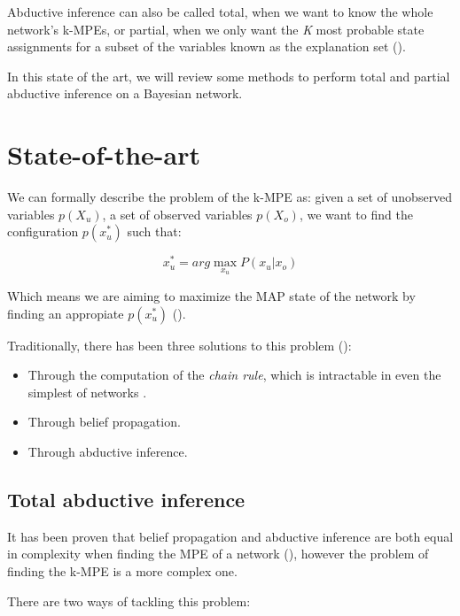 \documentclass[a4paper,11pt]{article}
\begin{document}
Abductive inference can also be called total, when we want to know the whole network's k-MPEs, or partial, when we only want the \textit{K} most probable state assignments for a subset of the variables known as the explanation set 
(\cite{fortier2013}).

In this state of the art, we will review some methods to perform total and partial abductive inference on a Bayesian network.

\section{State-of-the-art}

We can formally describe the problem of the k-MPE as: given a set of unobserved variables $p(X_u)$, a set of observed variables $p(X_o)$, we want to find the configuration $p(x^*_u)$ such that:

\begin{equation}
x^*_u = arg\max_{x_u} P(x_u | x_o)
\label{eqn:MPE}
\end{equation}

Which means we are aiming to maximize the MAP state of the network by finding an appropiate $p(x^*_u)$ (\cite{deCampos2002}).

Traditionally, there has been three solutions to this problem (\cite{deCampos2001}):

\begin{itemize}
\item Through the computation of the \textit{chain rule}, which is intractable in even the simplest of networks .
\item Through belief propagation.
\item Through abductive inference.
\end{itemize}


\subsection{Total abductive inference}
It has been proven that belief propagation and abductive inference are both equal in complexity when finding the MPE of a network (\cite{dawid1992}), however the problem of finding the k-MPE is a more complex one.

There are two ways of tackling this problem:
\end{document}
